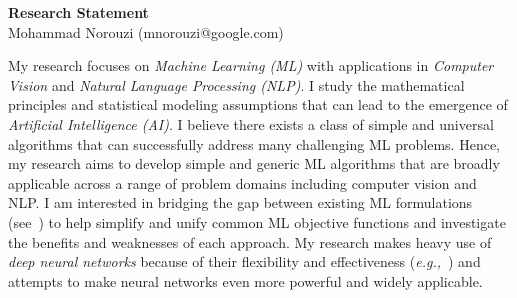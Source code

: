 \documentclass[a4paper, 10pt]{article}
\def\eg{{\em e.g.,}}
\begin{document}
\thispagestyle{fancy}
\lhead{}
\rhead{}
\renewcommand{\headrulewidth}{0pt} 
\renewcommand{\footrulewidth}{0pt} 


\pagestyle{fancy}
\lhead{\textcolor{gray}{\it Mohammad Norouzi}}
\rhead{\textcolor{gray}{\thepage/\totalpages{}}}


\begin{center}
{\LARGE \bf Research Statement}\\
\vspace*{0.1cm}
{\normalsize Mohammad Norouzi (mnorouzi@google.com)}
\vspace*{0.2cm}
\end{center}




My research focuses on {\em Machine Learning (ML)} with applications
in {\em Computer Vision} and {\em Natural Language Processing
  (NLP)}. I study the mathematical principles and statistical modeling
assumptions that can lead to the emergence of {\em Artificial
  Intelligence (AI)}.  I believe there exists a class of simple and
universal algorithms that can successfully address many challenging ML
problems. Hence, my research aims to develop simple and generic ML
algorithms that are broadly applicable across a range of problem
domains including computer vision and NLP. I am interested in bridging
the gap between existing ML formulations (see~\cite{raml,pcl}) to
help simplify and unify common ML objective functions and investigate
the benefits and weaknesses of each approach. My research makes heavy
use of {\em deep neural networks} because of their flexibility and
effectiveness (\eg~\cite{seq2seq,alphago}) and attempts to make neural
networks even more powerful and widely applicable.
\end{document}
